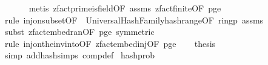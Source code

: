\begin{isabellebody}
\ \ \ \ \ \isamarkupfalse%
\ {\isacharparenleft}{\kern0pt}metis\ zfact{\isacharunderscore}{\kern0pt}prime{\isacharunderscore}{\kern0pt}is{\isacharunderscore}{\kern0pt}field{\isacharbrackleft}{\kern0pt}OF\ assms{\isacharparenleft}{\kern0pt}{}{\isacharparenright}{\kern0pt}{\isacharbrackright}{\kern0pt}\ zfact{\isacharunderscore}{\kern0pt}finite{\isacharbrackleft}{\kern0pt}OF\ p{\isacharunderscore}{\kern0pt}ge{\isacharunderscore}{\kern0pt}{}{\isacharbrackright}{\kern0pt}{\isacharparenright}{\kern0pt}\isanewline
\ \ \ \ \isamarkupfalse%
\ {\isacharparenleft}{\kern0pt}rule\ inj{\isacharunderscore}{\kern0pt}on{\isacharunderscore}{\kern0pt}subset{\isacharbrackleft}{\kern0pt}OF\ {\isacharunderscore}{\kern0pt}\ UniversalHashFamily{\isachardot}{\kern0pt}hash{\isacharunderscore}{\kern0pt}range{\isacharunderscore}{\kern0pt}{}{\isacharbrackleft}{\kern0pt}OF\ ring{\isacharunderscore}{\kern0pt}p\ assms{\isacharparenleft}{\kern0pt}{}{\isacharparenright}{\kern0pt}{\isacharbrackright}{\kern0pt}{\isacharbrackright}{\kern0pt}{\isacharparenright}{\kern0pt}\isanewline
\ \ \ \ \isamarkupfalse%
\ {\isacharparenleft}{\kern0pt}subst\ zfact{\isacharunderscore}{\kern0pt}embed{\isacharunderscore}{\kern0pt}ran{\isacharbrackleft}{\kern0pt}OF\ p{\isacharunderscore}{\kern0pt}ge{\isacharunderscore}{\kern0pt}{}{\isacharcomma}{\kern0pt}\ symmetric{\isacharbrackright}{\kern0pt}{\isacharparenright}{\kern0pt}\isanewline
\ \ \ \ \isamarkupfalse%
\ {\isacharparenleft}{\kern0pt}rule\ inj{\isacharunderscore}{\kern0pt}on{\isacharunderscore}{\kern0pt}the{\isacharunderscore}{\kern0pt}inv{\isacharunderscore}{\kern0pt}into{\isacharbrackleft}{\kern0pt}OF\ zfact{\isacharunderscore}{\kern0pt}embed{\isacharunderscore}{\kern0pt}inj{\isacharbrackleft}{\kern0pt}OF\ p{\isacharunderscore}{\kern0pt}ge{\isacharunderscore}{\kern0pt}{}{\isacharbrackright}{\kern0pt}{\isacharbrackright}{\kern0pt}{\isacharparenright}{\kern0pt}\isanewline
\isanewline
\ \ \isamarkupfalse%
\ {\isacharquery}{\kern0pt}thesis\isanewline
\ \ \ \ \isamarkupfalse%
\ {\isacharparenleft}{\kern0pt}simp\ add{\isacharcolon}{\kern0pt}hash{\isachardot}{\kern0pt}simps\ comp{\isacharunderscore}{\kern0pt}def{\isacharparenright}{\kern0pt}\isanewline
{}\isamarkupfalse%
%
\endisatagproof
{\isafoldproof}%
%
\isadelimproof
\isanewline
%
\endisadelimproof
\isanewline
{}\isamarkupfalse%
\ hash{\isacharunderscore}{\kern0pt}prob{\isacharcolon}{\kern0pt}\isanewline

\end{isabellebody}
